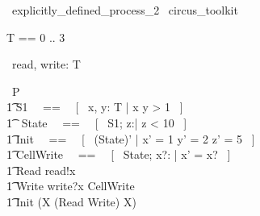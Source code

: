 % 
\begin{zsection}
  \SECTION\ explicitly\_defined\_process\_2 \parents\ circus\_toolkit
\end{zsection}

\begin{zed}
	T == 0 .. 3 
\end{zed}

\begin{circus}
	\circchannel\ read, write: T \\
\end{circus}

\begin{circus}
    \circprocess\ P \circdef \circbegin \\
        \t1 S1 ~~==~~ [~  x, y: T | x  \land y > 1 ~] \\
        \t1 \circstate\ State ~~==~~ [~ S1; z:\nat | z < 10 ~] \\
        \t1 Init ~~==~~ [~ (State)' | x' = 1 \land y' = 2 \land z' = 5 ~] \\
        \t1 CellWrite ~~==~~ [~ \Delta State; x?: \nat | x' = x? ~] \\
        \t1 Read \circdef read!x \then \Skip \\
        \t1 Write \circdef write?x \then \lschexpract CellWrite \rschexpract \\
        \t1 \circspot \lschexpract Init \rschexpract \circseq (\circmu X \circspot (Read \extchoice Write) \circseq X) \\ 
	\circend
\end{circus}

